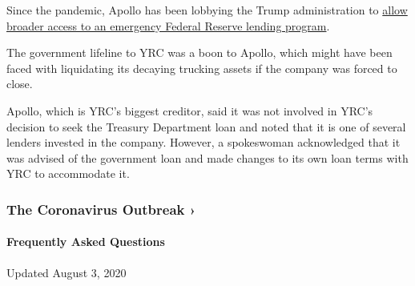 Since the pandemic, Apollo has been lobbying the Trump administration to
\href{https://www.nytimes.com/2020/04/04/business/economy/apollo-federal-reserve-lending-talf.html}{allow
broader access to an emergency Federal Reserve lending program}.

The government lifeline to YRC was a boon to Apollo, which might have
been faced with liquidating its decaying trucking assets if the company
was forced to close.

Apollo, which is YRC's biggest creditor, said it was not involved in
YRC's decision to seek the Treasury Department loan and noted that it is
one of several lenders invested in the company. However, a spokeswoman
acknowledged that it was advised of the government loan and made changes
to its own loan terms with YRC to accommodate it.

\href{https://www.nytimes.com/news-event/coronavirus?action=click\&pgtype=Article\&state=default\&region=MAIN_CONTENT_3\&context=storylines_faq}{}

\hypertarget{the-coronavirus-outbreak-}{%
\subsubsection{The Coronavirus Outbreak
›}\label{the-coronavirus-outbreak-}}

\hypertarget{frequently-asked-questions}{%
\paragraph{Frequently Asked
Questions}\label{frequently-asked-questions}}

Updated August 3, 2020

